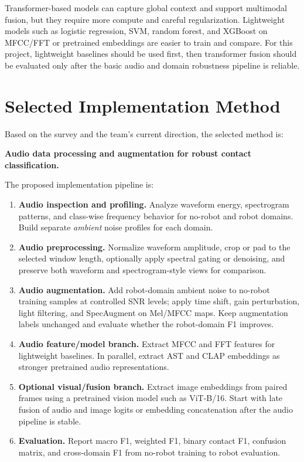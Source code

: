 \documentclass[12pt,a4paper]{article}
\begin{document}
Transformer-based models can capture global context and support multimodal fusion, but they require more compute and careful regularization. Lightweight models such as logistic regression, SVM, random forest, and XGBoost on MFCC/FFT or pretrained embeddings are easier to train and compare. For this project, lightweight baselines should be used first, then transformer fusion should be evaluated only after the basic audio and domain robustness pipeline is reliable.

\section{Selected Implementation Method}

Based on the survey and the team's current direction, the selected method is:

\begin{center}
\textbf{Audio data processing and augmentation for robust contact classification.}
\end{center}

The proposed implementation pipeline is:

\begin{enumerate}[leftmargin=1.5em]
\item \textbf{Audio inspection and profiling.} Analyze waveform energy, spectrogram patterns, and class-wise frequency behavior for no-robot and robot domains. Build separate \textit{ambient} noise profiles for each domain.
\item \textbf{Audio preprocessing.} Normalize waveform amplitude, crop or pad to the selected window length, optionally apply spectral gating or denoising, and preserve both waveform and spectrogram-style views for comparison.
\item \textbf{Audio augmentation.} Add robot-domain ambient noise to no-robot training samples at controlled SNR levels; apply time shift, gain perturbation, light filtering, and SpecAugment on Mel/MFCC maps. Keep augmentation labels unchanged and evaluate whether the robot-domain F1 improves.
\item \textbf{Audio feature/model branch.} Extract MFCC and FFT features for lightweight baselines. In parallel, extract AST and CLAP embeddings as stronger pretrained audio representations.
\item \textbf{Optional visual/fusion branch.} Extract image embeddings from paired frames using a pretrained vision model such as ViT-B/16. Start with late fusion of audio and image logits or embedding concatenation after the audio pipeline is stable.
\item \textbf{Evaluation.} Report macro F1, weighted F1, binary contact F1, confusion matrix, and cross-domain F1 from no-robot training to robot evaluation.
\end{enumerate}
\end{document}
